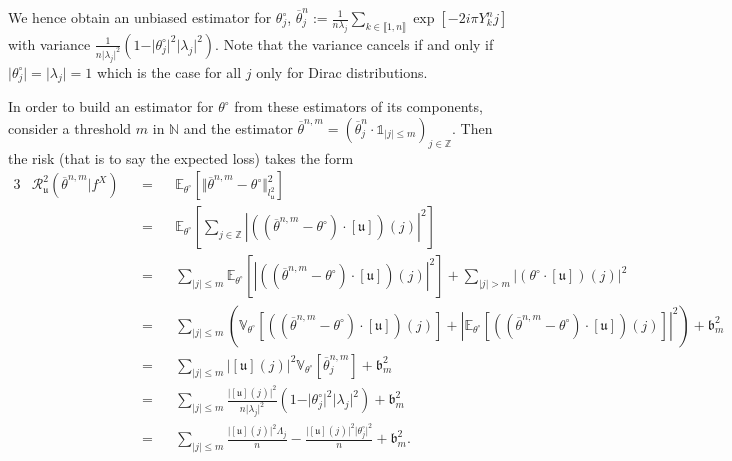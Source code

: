 We hence obtain an unbiased estimator for $\theta^{\circ}_{j}$, $\overline{\theta}^{n}_{j} := \frac{1}{n\lambda_{j}}\sum\limits_{k \in \llbracket 1, n \rrbracket} \exp[- 2 i \pi Y_{k}^{n} j]$ with variance $\frac{1}{n\vert\lambda_{j}\vert^{2}}\left(1 - \vert\theta^{\circ}_{j}\vert^{2}\vert\lambda_{j}\vert^{2}\right).$
Note that the variance cancels if and only if $\vert\theta^{\circ}_{j}\vert = \vert\lambda_{j}\vert = 1$ which is the case for all $j$ only for Dirac distributions.

In order to build an estimator for $\theta^{\circ}$ from these estimators of its components, consider a threshold $m$ in $\mathds{N}$ and the estimator $\overline{\theta}^{n, m} = \left(\overline{\theta}^{n}_{j} \cdot \mathds{1}_{\vert j \vert \leq m}\right)_{j \in \mathds{Z}}$.
Then the risk (that is to say the expected loss) takes the form
\begin{alignat*}{3}
& \mathcal{R}_{\mathfrak{u}}^{2}(\overline{\theta}^{n, m} \vert f^{X}) &&=&& \mathds{E}_{\theta^{\circ}}\left[\Vert \overline{\theta}^{n, m} - \theta^{\circ} \Vert_{l^{2}_{\mathfrak{u}}}^{2} \right]\\
& && = && \mathds{E}_{\theta^{\circ}}\left[\sum\limits_{j \in \mathds{Z}} \left\vert \left(\left(\overline{\theta}^{n, m} - \theta^{\circ} \right)\cdot[\mathfrak{u}]\right)(j) \right\vert^{2} \right]\\
& &&=&&\sum\limits_{\vert j \vert \leq m} \mathds{E}_{\theta^{\circ}}\left[ \left\vert \left(\left(\overline{\theta}^{n, m} - \theta^{\circ} \right)\cdot[\mathfrak{u}]\right)(j) \right\vert^{2} \right] + \sum\limits_{\vert j \vert > m} \left\vert \left(\theta^{\circ}\cdot[\mathfrak{u}]\right)(j) \right\vert^{2}\\
& &&=&&\sum\limits_{\vert j \vert \leq m} \left(\mathds{V}_{\theta^{\circ}}\left[ \left(\left(\overline{\theta}^{n, m} - \theta^{\circ} \right)\cdot[\mathfrak{u}]\right)(j) \right]+ \left\vert \mathds{E}_{\theta^{\circ}}\left[\left(\left(\overline{\theta}^{n, m} - \theta^{\circ} \right)\cdot[\mathfrak{u}]\right)(j)\right]\right\vert^{2} \right) + \mathfrak{b}_{m}^{2}\\
& &&=&&\sum\limits_{\vert j \vert \leq m} \vert[\mathfrak{u}](j)\vert^{2} \mathds{V}_{\theta^{\circ}}\left[ \overline{\theta}^{n, m}_{j} \right] + \mathfrak{b}_{m}^{2}\\
& &&=&&\sum\limits_{\vert j \vert \leq m} \frac{\vert[\mathfrak{u}](j)\vert^{2}}{n\vert\lambda_{j}\vert^{2}}\left(1 - \vert\theta^{\circ}_{j}\vert^{2}\vert\lambda_{j}\vert^{2}\right) + \mathfrak{b}_{m}^{2}\\
& &&=&&\sum\limits_{\vert j \vert \leq m} \frac{\vert[\mathfrak{u}](j)\vert^{2}\Lambda_{j}}{n} - \frac{\vert[\mathfrak{u}](j)\vert^{2}\vert\theta^{\circ}_{j}\vert^{2}}{n} + \mathfrak{b}_{m}^{2}.
\end{alignat*}


